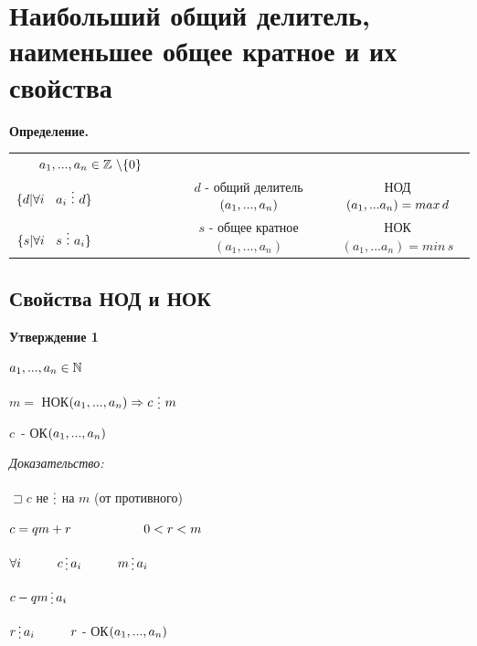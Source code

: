 \documentclass[12pt]{article}
\begin{document}
\section{Наибольший общий делитель, наименьшее общее кратное и их свойства}
\textbf{Определение.}\par
\begin{tabular}{ccc}
    $a_1,...,a_n \in \mathbb{Z} \, \, \backslash \{0\} \vspace{2 ex}$                                                                                                 \\
    $\{ d|\forall i \ \hspace{2 mm} a_i \ \vdots\ d\} \hspace{2 cm}$ & $d$ - общий делитель$(a_1,...,a_n) \vspace{2 ex}$ & НОД$(a_1,...a_n) = max \, d \vspace{2 ex}$ \\
    $\{ s|\forall i \ \hspace{2 mm} s \ \vdots\ a_i\} \hspace{2 cm}$ & $s$ - общее кратное$(a_1,...,a_n)$                & НОК$(a_1,...a_n) = min \, s $              \\
\end{tabular}\par

\subsection{Свойства НОД и НОК}
\textbf{Утверждение 1}\par
$a_1,...,a_n \in \mathbb{N} \vspace{1 ex}$\par
$m =$ НОК$(a_1,...,a_n) \Rightarrow c\, \mathop{\raisebox{-2pt}{\vdots}} \,m$\par
$c \,$ - ОК$(a_1,...,a_n) \newline$\par
\textit{Доказательство:}\par
$\sqsupset c$ не $\mathop{\raisebox{-2pt}{\vdots}}$ на $m$ (от противного)\par
$c = qm+r \hspace{2 cm} 0 < r < m$\par
$\forall i \hspace{1 cm} c \mathop{\raisebox{-2pt}{\vdots}} a_i \hspace{1 cm} m \mathop{\raisebox{-2pt}{\vdots}} a_i$\par
$c-qm \mathop{\raisebox{-2pt}{\vdots}} a_i$\par
$r \mathop{\raisebox{-2pt}{\vdots}} a_i \hspace{1 cm} r$ - ОК$(a_1,...,a_n) \newline$\par
\end{document}
